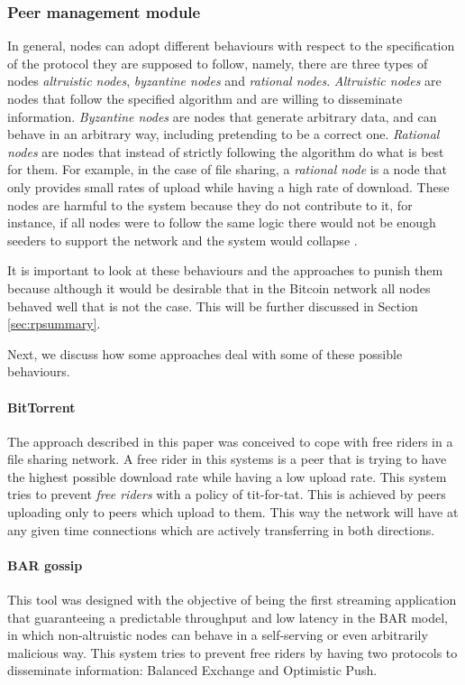 \subsubsection{Peer management module}
\label{sec:peer_management_module}


\label{sec:nodesbehaviour}
In general, nodes can adopt different behaviours with respect to the specification of the protocol they are supposed to follow, namely, there are three types of nodes \textit{altruistic nodes},  \textit{byzantine nodes} and \textit{rational nodes}. \textit{Altruistic nodes} are nodes that follow the specified algorithm and are willing to disseminate information. \textit{Byzantine nodes} are nodes that generate arbitrary data, and can behave in an arbitrary way, including pretending to be a correct one. \textit{Rational nodes} are nodes that instead of strictly following the algorithm do what is best for them. For example, in the case of file sharing, a \textit{rational node} is a node that only provides small rates of upload while having a high rate of download. These nodes are harmful to the system because they do not contribute to it, for instance, if all nodes were to follow the same logic there would not be enough seeders to support the network and the system would collapse \cite{li2006bar, cohen2003incentives}.

It is important to look at these behaviours and the approaches to punish them because although it would be desirable that in the Bitcoin network all nodes behaved well that is not the case. This will be further discussed in Section \ref{sec:rpsummary}.

Next, we discuss how some approaches deal with some of these possible behaviours.

\paragraph*{\textbf{BitTorrent} \cite{cohen2003incentives}}
The approach described in this paper was conceived to cope with free riders in a file sharing network. A free rider in this systems is a peer that is trying to have the highest possible download rate while having a low upload rate. This system tries to prevent \textit{free riders} with a policy of tit-for-tat. This is achieved by peers uploading only to peers which upload to them. This way the network will have at any given time connections which are actively transferring in both directions.

\paragraph*{\textbf{BAR gossip} \cite{li2006bar}}
This tool was designed with the objective of being the first streaming application that guaranteeing a predictable throughput and low latency in the BAR model, in which non-altruistic nodes can behave in a self-serving or even arbitrarily malicious way. This system tries to prevent free riders by having two protocols to disseminate information: Balanced Exchange and Optimistic Push.

